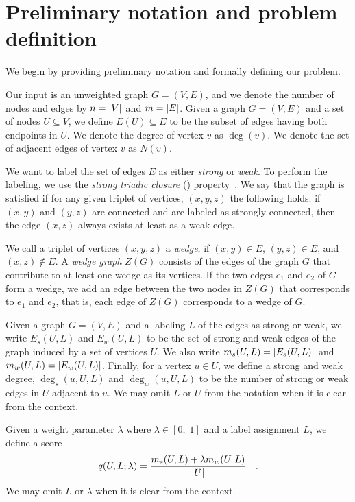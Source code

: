 \section{Preliminary notation and problem definition}\label{sec:prel}

We begin by providing preliminary notation and formally defining our problem.

Our input is an unweighted graph  $G = (V, E)$, and we denote the number of nodes and edges by $n = {\left|V\right|}$ and  $m = {\left|E\right|}$. 
Given a graph $G = (V, E)$ and a set of nodes $U \subseteq V$, we define $E(U) \subseteq E$ to be the subset of edges having both endpoints in $U$. We denote the degree of vertex $v$ as $\deg(v)$. We denote the set of adjacent edges of vertex $v$ as $N(v)$.  %

We want to label the set of edges $E$ as either {\em strong} or {\em weak}. 
To perform the labeling,  we use the \emph{strong triadic closure} ({\stc}) property~\cite{sintos2014using}.  We say that the graph is \stc satisfied if for any given triplet of vertices, $(x, y, z)$ the following holds: if  $(x, y)$ and $(y, z)$ are connected and are labeled as strongly connected, then the edge $(x, z)$  always exists at least as a  weak edge. 

We call a triplet of vertices $(x, y, z)$  a {\em wedge}, if $(x, y) \in E$, $(y, z) \in E$, and $(x, z) \notin E$.
A \emph{wedge graph} $Z(G)$ consists of the edges of the graph $G$ that contribute to at least one wedge as its vertices. If the two edges $e_1$ and $e_2$ of $G$ form a wedge, we add an edge between the two nodes in $Z(G)$ that corresponds to $e_1$ and $e_2$, that is, each edge of $Z(G)$ corresponds to a wedge of $G$.
 

Given a graph $G = (V, E)$ and a labeling $L$ of the edges as {strong} or  {weak}, we write $E_s(U, L)$ and  $E_w(U, L)$ to be the set of {strong} and {weak} edges of the graph induced by a set of vertices $U$.
We also write $m_s(U, L) = {\left|E_s(U, L)\right|}$ and $m_w(U, L) = {\left|E_w(U, L)\right|}$.
Finally, for a vertex $u \in U$, we define a strong and weak degree, $\deg_s(u, U, L)$ and $\deg_w(u, U, L)$ to be the number of strong or weak edges in $U$ adjacent to $u$. We may omit $L$ or $U$ from the notation when it is clear from the context.
 

Given a weight parameter $\lambda$ where $\lambda \in [0,\;1]$ and a label assignment $L$, we define a score
\[
	\score{U, L; \lambda} =\frac{m_s(U, L) + \lambda m_w(U, L)} {\abs{U}} \quad .
\]
We may omit $L$ or $\lambda$ when it is clear from the context.

